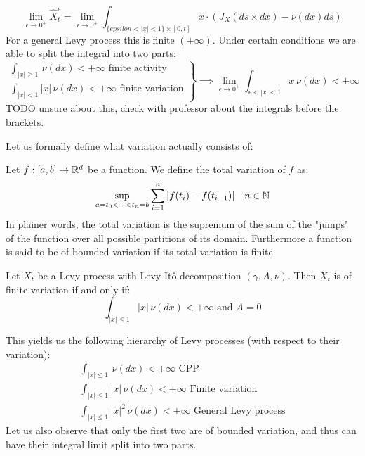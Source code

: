 \begin{property}
    \item \[ \lim_{\epsilon\to0^+} \hat{X}^\epsilon_t =
    \lim_{\epsilon\to0^+} \int_{\{epsilon<|x|<1\} \times [0,t]} x \cdot
    \left( J_X(ds \times dx) - \nu(dx)ds \right) \]
    For a general Levy process this is finite $(+\infty)$. Under certain
    conditions we are able to split the integral into two parts:
    \[ \left. \begin{array}{l}
        \int_{|x|\geq1} \, \nu(dx) < +\infty \text{ finite activity} \\
        \int_{|x|<1} |x| \, \nu(dx) < +\infty \text{ finite variation}
    \end{array} \right\} \implies
        \lim_{\epsilon\to0^+} \int_{\epsilon<|x|<1} x \, \nu(dx) < +\infty
    \]
    TODO unsure about this, check with professor about the integrals before
    the brackets.
\end{property}

Let us formally define what variation actually consists of:

\begin{definition*}
    Let $f:[a,b]\to\mathbb{R}^d$ be a function. We define the total variation of $f$ as:
    \[ \sup_{a=t_0<\dots<t_n=b} \sum_{i=1}^n |f(t_i)-f(t_{i-1})| \quad n\in\mathbb{N}\]
    In plainer words, the total variation is the supremum of the sum of the
    "jumps" of the function over all possible partitions of its domain. 
    Furthermore a function is said to be of bounded variation if its total
    variation is finite.
\end{definition*}

\begin{theorem*}
    Let $X_t$ be a Levy process with Levy-Itô decomposition $(\gamma, A, \nu)$.
    Then $X_t$ is of finite variation if and only if:
    \[ \int_{|x|\leq1} |x| \, \nu(dx) < +\infty \text{ and } A = 0 \]
\end{theorem*}
This yields us the following hierarchy of Levy processes (with respect to their
variation):
\[ \begin{array}{l}
    \int_{|x|\leq1} \, \nu(dx) < +\infty \text{ CPP} \\
    \int_{|x|\leq1} |x| \, \nu(dx) < +\infty \text{ Finite variation} \\
    \int_{|x|\leq1} |x|^2 \, \nu(dx) < +\infty \text{ General Levy process}
\end{array} \]
Let us also observe that only the first two are of bounded variation, and thus
can have their integral limit split into two parts.
